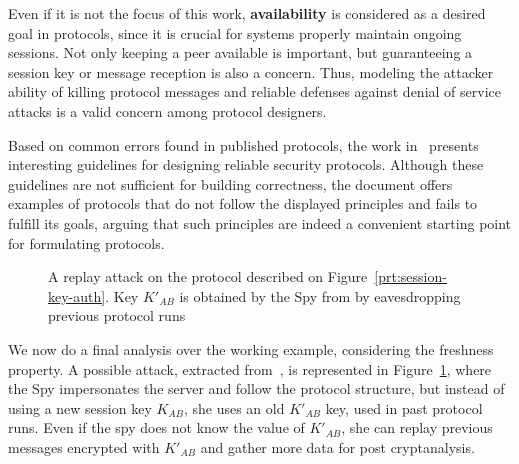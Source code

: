 Even if it is not the focus of this work, \textbf{availability} is considered as a desired goal in protocols, since it is crucial for systems properly maintain ongoing sessions. Not only keeping a peer available is important, but guaranteeing a session key or message reception is also a concern. Thus, modeling the attacker ability of killing protocol messages and reliable defenses against denial of service attacks is a valid concern among protocol designers.

Based on common errors found in published protocols, the work in~\cite{AbadiNeedham96} presents interesting guidelines for designing reliable security protocols. Although these guidelines are not sufficient for building correctness, the document offers examples of protocols that do not follow the displayed principles and fails to fulfill its goals, arguing that such principles are indeed a convenient starting point for formulating protocols.

\begin{figure}[!ht]\label{fig:attack-ex-replay}
  \centering

  \caption{A replay attack on the protocol described on Figure~\ref{prt:session-key-auth}. Key \(K'_{AB}\) is obtained by the Spy from by eavesdropping previous protocol runs}
\end{figure}

We now do a final analysis over the working example, considering the freshness property. A possible attack, extracted from~\cite{BoydMathuria2008}, is represented in Figure~\ref{fig:attack-ex-replay}, where the Spy impersonates the server and follow the protocol structure, but instead of using a new session key \(K_{AB}\), she uses an old \(K'_{AB}\) key, used in past protocol runs. Even if the spy does not know the value of \(K'_{AB}\), she can replay previous messages encrypted with \(K'_{AB}\) and gather more data for post cryptanalysis.

